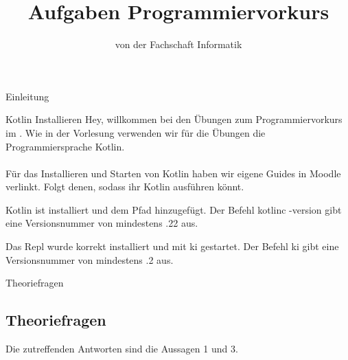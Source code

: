
\title{Aufgaben Programmiervorkurs}
\subtitle{von der Fachschaft Informatik\hfill\ptitle}

\usepackage{hyperref}
\usepackage{wrapfig}


\maketitle{}

\begin{task}[points=auto]{Einleitung}
    \begin{subtask*}[points=0]{Kotlin Installieren}
        Hey, willkommen bei den Übungen zum Programmiervorkurs im \ptitle. Wie in der
        Vorlesung verwenden wir für die Übungen die Programmiersprache Kotlin. \\\\
        Für das Installieren und Starten von Kotlin haben wir eigene Guides in Moodle verlinkt.
        Folgt denen, sodass ihr Kotlin ausführen könnt.
        \begin{solution}
            Kotlin ist installiert und dem Pfad hinzugefügt. Der Befehl
            {\ttfamily kotlinc -version} gibt eine Versionsnummer von mindestens {.22} aus.

            Das Repl wurde korrekt installiert und mit {\ttfamily ki} gestartet. Der Befehl
            {\ttfamily ki} gibt eine Versionsnummer von mindestens {.2} aus.
        \end{solution}
    \end{subtask*}
    \begin{subtask*}[points=0]{Theoriefragen}
        \subsection{Theoriefragen}
        \begin{itemize}
            \mchead
        \end{itemize}
        \begin{solution}
            Die zutreffenden Antworten sind die Aussagen 1 und 3.
        \end{solution}
    \end{subtask*}
\end{task}
